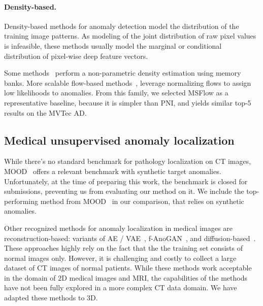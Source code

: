 
\paragraph{Density-based.} Density-based methods for anomaly detection model the distribution of the training image patterns. As modeling of the joint distribution of raw pixel values is infeasible, these methods usually model the marginal or conditional distribution of pixel-wise deep feature vectors.

Some methods~\cite{ttr, pni} perform a non-parametric density estimation using memory banks. More scalable flow-based methods~\cite{fastflow,cflow,msflow}, leverage normalizing flows to assign low likelihoods to anomalies. From this family, we selected MSFlow as a representative baseline, because it is simpler than PNI, and yields similar top-5 results on the MVTec AD. 


\subsection{Medical unsupervised anomaly localization}
While there's no standard benchmark for pathology localization on CT images, MOOD~\cite{mood} offers a relevant benchmark with synthetic target anomalies. Unfortunately, at the time of preparing this work, the benchmark is closed for submissions, preventing us from evaluating our method on it. We include the top-performing method from MOOD~\cite{mood_top1} in our comparison, that relies on synthetic anomalies.

Other recognized methods for anomaly localization in medical images are reconstruction-based: variants of AE / VAE~\cite{autoencoder, dylov}, f-AnoGAN~\cite{fanogan}, and diffusion-based~\cite{latent_diffusion}. These approaches highly rely on the fact that the the training set consists of normal images only. However, it is challenging and costly to collect a large dataset of CT images of normal patients. While these methods work acceptable in the domain of 2D medical images and MRI, the capabilities of the methods have not been fully explored in a more complex CT data domain. We have adapted these methods to 3D.
